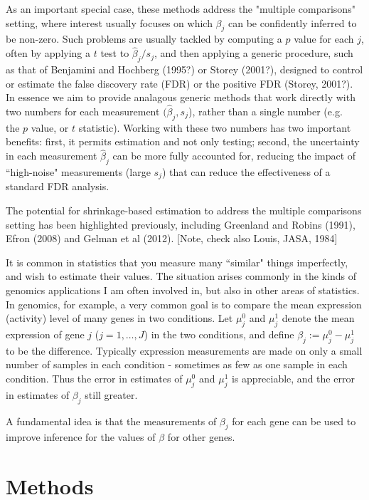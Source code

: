\documentclass[10pt]{article}
\begin{document}
As an important special case, these methods address the "multiple comparisons" setting, where interest usually focuses on which $\beta_j$ can be confidently inferred to be non-zero. Such problems are usually tackled by computing a $p$ value for each $j$, often by applying a $t$ test to $\hat\beta_j/s_j$,
and then applying a generic procedure, such as that of Benjamini 
and Hochberg (1995?) or Storey (2001?), designed to control or
estimate the false discovery rate (FDR) or the positive FDR (Storey, 2001?). In essence we aim to provide analagous
generic methods that work directly with two numbers for each 
measurement $(\hat\beta_j,s_j$), rather than a single number (e.g.~ the $p$ value, or $t$ statistic). Working with these two numbers has two important benefits: first, it permits estimation and not only testing; second, the 
uncertainty in each measurement $\hat\beta_j$ can be more fully accounted for, reducing the impact of ``high-noise" measurements (large $s_j$) that can reduce the effectiveness of a standard FDR analysis. 

The potential for shrinkage-based estimation to
address the multiple comparisons setting 
has been highlighted
previously, including Greenland and Robins (1991),
Efron (2008) and Gelman et al (2012). [Note, check also Louis, JASA, 1984] 



It is common in statistics that you measure many ``similar" things imperfectly, and wish to estimate their values. The situation arises commonly in the kinds of genomics applications I am often involved in, but also in other areas of statistics.
In genomics, for example, a very common goal
is to compare the mean
expression (activity) level of many genes in two conditions.
Let $\mu^0_j$ and $\mu^1_j$ denote the mean expression 
of gene $j$ ($j=1,\dots,J$) in the two conditions, and define $\beta_j:= \mu^0_j - \mu^1_j$ to be the difference. Typically expression
measurements are made on only a small number of
samples in each condition - sometimes as few as one
sample in each condition. Thus the error in estimates
of $\mu^0_j$ and $\mu^1_j$ is appreciable, and the error
in estimates of $\beta_j$ still greater.

A fundamental idea is
that the measurements of $\beta_j$ for each gene can be used to improve inference for the values of $\beta$ for other genes.




 \section*{Methods}
 
\end{document}
